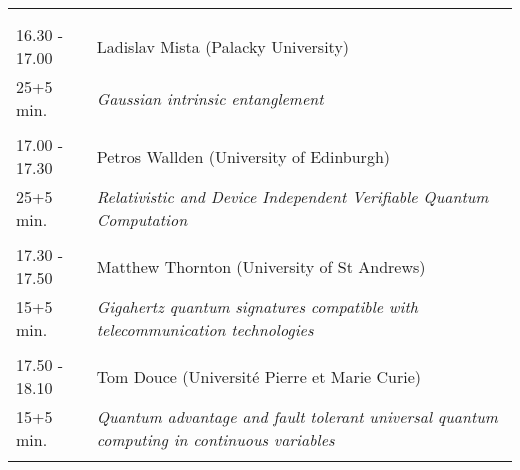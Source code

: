 \begin{longtable}{p{3cm}p{13cm}}
 & \\ 
 & \\ 
16.30 - 17.00 & Ladislav Mista (Palacky University)\\ 
25+5 min. & {\it Gaussian intrinsic entanglement}\\ 
 & \\ 
17.00 - 17.30 & Petros Wallden (University of Edinburgh)\\ 
25+5 min. & {\it Relativistic and Device Independent Verifiable Quantum Computation}\\ 
 & \\ 
17.30 - 17.50 & Matthew Thornton (University of St Andrews)\\ 
15+5 min. & {\it Gigahertz quantum signatures compatible with telecommunication technologies}\\ 
 & \\ 
17.50 - 18.10 & Tom Douce (Université Pierre et Marie Curie)\\ 
15+5 min. & {\it Quantum advantage and fault tolerant universal quantum computing in continuous variables}\\ 
 & \\ 
\end{longtable}

